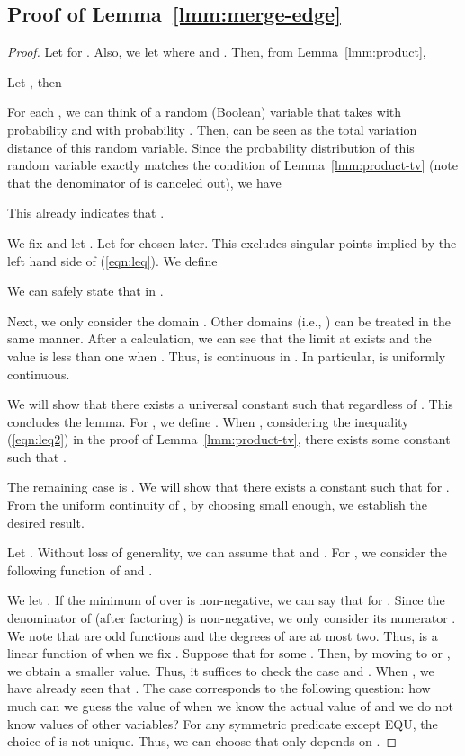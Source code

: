 \documentclass[letterpaper,11pt]{article}
\newcommand{\equ}{\textsf{EQU}\xspace}
\begin{document}
\subsection{Proof of Lemma~\ref{lmm:merge-edge}}\label{apx:merge-edge}
\begin{proof}
  Let  for .
  Also, we let  where  and .
  Then, from Lemma~\ref{lmm:product}, 
  
  Let , then 
  
  For each , 
  we can think of a random (Boolean) variable that takes  with probability  and  with probability .
  Then,  can be seen as the total variation distance of this random variable.
  Since the probability distribution of this random variable exactly matches the condition of Lemma~\ref{lmm:product-tv} (note that the denominator of  is canceled out), 
  we have
  
  This already indicates that .

  We fix  and let .
  Let  for  chosen later.
  This excludes singular points implied by the left hand side of (\ref{eqn:leq}).
  We define
  
  We can safely state that  in .

  Next, we only consider the domain .
  Other domains (i.e., ) can be treated in the same manner.
  After a calculation,
  we can see that the limit at  exists and the value is less than one when .
  Thus,  is continuous in .
  In particular,  is uniformly continuous.

  We will show that there exists a universal constant  such that  regardless of .
  This concludes the lemma.
  For , 
  we define .
  When , 
  considering the inequality (\ref{eqn:leq2}) in the proof of Lemma~\ref{lmm:product-tv},
  there exists some constant  such that .

  The remaining case is .
  We will show that there exists a constant  such that  for .
  From the uniform continuity of , 
  by choosing  small enough,
  we establish the desired result.

  Let .
  Without loss of generality,
  we can assume that  and .
  For , 
  we consider the following function of  and .
  
  We let .
  If the minimum of  over  is non-negative, 
  we can say that  for .
  Since the denominator of  (after factoring) is non-negative,
  we only consider its numerator .
  We note that  are odd functions and the degrees of  are at most two.
  Thus,  is a linear function of  when we fix .
  Suppose that  for some .
  Then, by moving  to  or ,
  we obtain a smaller value.
  Thus, it suffices to check the case  and .
  When , we have already seen that .
  The case  corresponds to the following question:
  how much can we guess the value of  when we know the actual value of  and we do not know values of other variables?
  For any symmetric predicate except \equ, 
  the choice of  is not unique.
  Thus, we can choose  that only depends on .
\end{proof}
\end{document}
